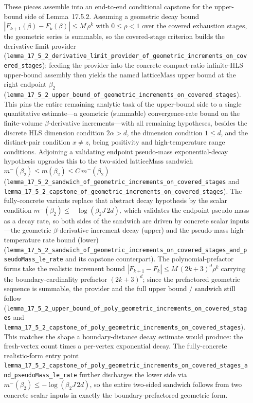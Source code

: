 \documentclass[a4paper,11pt]{article}
\begin{document}
These pieces assemble into an end-to-end conditional capstone for the
upper-bound side of Lemma~17.5.2.  Assuming a geometric decay bound
\(|F_{k+1}(\beta)-F_k(\beta)|\le M\,\rho^k\) with \(0\le\rho<1\) over the covered
exhaustion stages, the geometric series is summable, so the covered-stage
criterion builds the derivative-limit provider
(\texttt{lemma\_17\_5\_2\_derivative\_limit\_provider\_of\_geometric\_increments\_on\_covered\_stages});
feeding the provider into the concrete compact-ratio infinite-HLS upper-bound
assembly then yields the named \(\mathrm{latticeMass}\) upper bound at the right
endpoint \(\beta_2\)
(\texttt{lemma\_17\_5\_2\_upper\_bound\_of\_geometric\_increments\_on\_covered\_stages}).
This pins the entire remaining analytic task of the upper-bound side to a single
quantitative estimate---a geometric (summable) convergence-rate bound on the
finite-volume \(\beta\)-derivative increments---with all remaining hypotheses,
besides the discrete HLS dimension condition \(2\alpha>d\), the dimension
condition \(1\le d\), and the distinct-pair condition \(x\neq z\), being
positivity and high-temperature range conditions.  Adjoining a validating
endpoint pseudo-mass exponential-decay hypothesis upgrades this to the two-sided
\(\mathrm{latticeMass}\) sandwich \(m^-(\beta_2)\le m(\beta_2)\le C\,m^-(\beta_2)\)
(\texttt{lemma\_17\_5\_2\_sandwich\_of\_geometric\_increments\_on\_covered\_stages}
and \texttt{lemma\_17\_5\_2\_capstone\_of\_geometric\_increments\_on\_covered\_stages}).
The fully-concrete variants replace that abstract decay hypothesis by the
scalar condition \(m^-(\beta_2)\le-\log(\beta_2 J\,2d)\), which validates the
endpoint pseudo-mass as a decay rate, so both sides of the sandwich are driven by
concrete scalar inputs---the geometric \(\beta\)-derivative increment decay
(upper) and the pseudo-mass high-temperature rate bound (lower)
(\texttt{lemma\_17\_5\_2\_sandwich\_of\_geometric\_increments\_on\_covered\_stages\_and\_pseudoMass\_le\_rate}
and its capstone counterpart).  The polynomial-prefactor forms take the realistic
increment bound \(|F_{k+1}-F_k|\le M\,(2k+3)^d\rho^k\) carrying the
boundary-cardinality prefactor \((2k+3)^d\); since the prefactored geometric
sequence is summable, the provider and the full upper bound / sandwich still
follow (\texttt{lemma\_17\_5\_2\_upper\_bound\_of\_poly\_geometric\_increments\_on\_covered\_stages}
and \texttt{lemma\_17\_5\_2\_capstone\_of\_poly\_geometric\_increments\_on\_covered\_stages}).
This matches the shape a boundary-distance decay estimate would produce: the
fresh-vertex count times a per-vertex exponential decay.  The fully-concrete
realistic-form entry point
\texttt{lemma\_17\_5\_2\_capstone\_of\_poly\_geometric\_increments\_on\_covered\_stages\_and\_pseudoMass\_le\_rate}
further discharges the lower side via \(m^-(\beta_2)\le-\log(\beta_2 J\,2d)\), so
the entire two-sided sandwich follows from two concrete scalar inputs in exactly
the boundary-prefactored geometric form.
\end{document}
